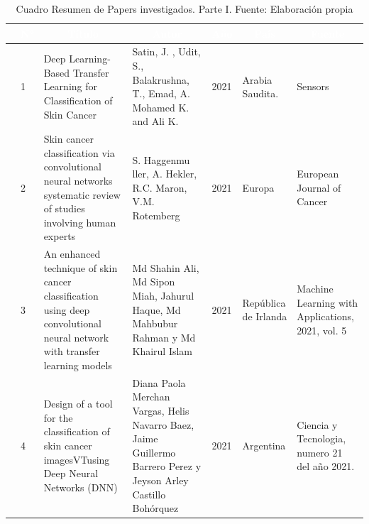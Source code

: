 \begin{table}[h]
	\newcommand{\multirot}[1]{\multirow{2}{*}[-8ex]{\rotcell{\rlap{#1}}}}
	\footnotesize
	\centering
	\begin{longtable}{|m{0.5cm}|m{0.3cm}|m{4cm}|m{2cm}|m{0.6cm}|m{1.7cm}|m{3cm}|} 
		\hline
		\rowcolor[rgb]{0,0.251,0.502} \multicolumn{1}{|c|}{\textcolor{white}{Tipo}} & \multicolumn{1}{c|}{\textcolor{white}{N°}} & \multicolumn{1}{c|}{\textcolor{white}{Título}}                                                                             & \multicolumn{1}{c|}{\textcolor{white}{Autor}}        & \multicolumn{1}{c|}{\textcolor{white}{Año}} & \multicolumn{1}{c|}{\textcolor{white}{País}} & \multicolumn{1}{c|}{\textcolor{white}{Fuente}}                                                        \\ 
		\hline
		\multirot{Problema}                                        & 1                                             & Deep Learning-Based Transfer Learning for Classification of Skin Cancer~                                                                               & Satin, J. , Udit, S., Balakrushna, T., Emad, A. Mohamed K. and Ali K. & 2021 &  Arabia Saudita. & Sensors \\ 
		\cline{2-7}
		& 2& Skin cancer classification via convolutional neural networks systematic review of studies involving human experts & S. Haggenmu ller, A. Hekler, R.C. Maron, V.M. Rotemberg& 2021& Europa& European Journal of Cancer \\ 
		\hline
		\multirow{3}{*}[-14ex]{\rotcell{\rlap{Propuesta}}}
		& 3                                             & An enhanced technique of skin cancer classification using deep convolutional neural network with transfer learning models~                                                                               & Md Shahin Ali, Md Sipon Miah, Jahurul Haque, Md Mahbubur Rahman y Md Khairul Islam                                 & 2021                                        &  República de Irlanda         & Machine Learning with Applications, 2021, vol. 5                                                                  \\ 
		\cline{2-7}
		& 4 & Design of a tool for the classification of skin cancer imagesVTusing Deep Neural Networks (DNN) & Diana Paola Merchan Vargas, Helis Navarro Baez, Jaime Guillermo Barrero Perez y Jeyson Arley Castillo Bohórquez   & 2021& Argentina       & Ciencia y Tecnologia, numero 21 del año 2021.                                                    \\ 
	
		
		\hline
	\end{longtable}
	\caption{Cuadro Resumen de Papers investigados. Parte I. Fuente: Elaboración propia}
\label{A:table}
\end{table}


